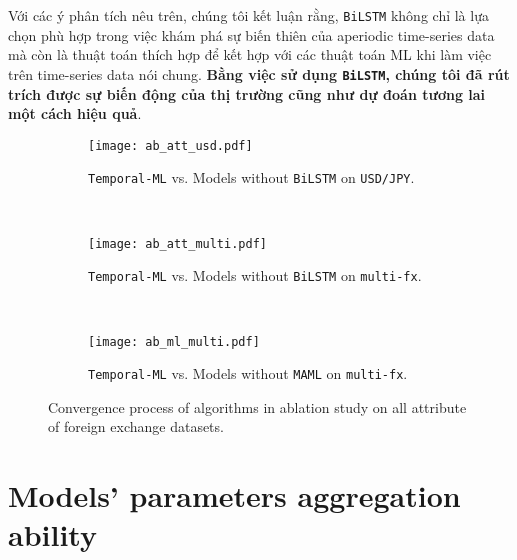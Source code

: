 Với các ý phân tích nêu trên, chúng tôi kết luận rằng, \verb|BiLSTM| không chỉ là lựa chọn phù hợp trong việc khám phá sự biến thiên của aperiodic time-series data mà còn là thuật toán thích hợp để kết hợp với các thuật toán ML khi làm việc trên time-series data nói chung. \textbf{Bằng việc sử dụng \Verb|BiLSTM|, chúng tôi đã rút trích được sự biến động của thị trường cũng như dự đoán tương lai một cách hiệu quả}.

\begin{sidewaysfigure}[h]
    \centering
    \begin{subfigure}[b]{\textwidth}
        \centering
        \texttt{[image: ab\_att\_usd.pdf]}
        \cprotect\caption{\verb|Temporal-ML| vs. Models without \verb|BiLSTM| on \verb|USD/JPY|.}
        \label{fig:ablation_att_usd}
    \end{subfigure}
    ~
    \begin{subfigure}[b]{\textwidth}
        \centering
        \texttt{[image: ab\_att\_multi.pdf]}
        \cprotect\caption{\verb|Temporal-ML| vs. Models without \verb|BiLSTM| on \verb|multi-fx|.}
        \label{fig:ablation_att_multi}
    \end{subfigure}
    ~
    \begin{subfigure}[b]{\textwidth}
        \centering
        \texttt{[image: ab\_ml\_multi.pdf]}
        \cprotect\caption{\verb|Temporal-ML| vs. Models without \verb|MAML| on \verb|multi-fx|.}
        \label{fig:ablation_ml_multi}
    \end{subfigure}
    \cprotect\caption{Convergence process of algorithms in ablation study on all attribute of foreign exchange datasets.}
    \label{fig:ablation}
\end{sidewaysfigure}

\section{Models' parameters aggregation ability}


